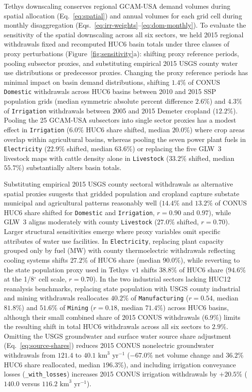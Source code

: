 \documentclass[fleqn,10pt]{wlscirep}
\begin{document}
Tethys downscaling conserves regional GCAM-USA demand volumes during spatial allocation (Eq.~\ref{eq:spatial}) and annual volumes for each grid cell during monthly disaggregation (Eqs.~\ref{eq:irr-weights}--\ref{eq:dom-monthly}). To evaluate the sensitivity of the spatial downscaling across all six sectors, we held 2015 regional withdrawals fixed and recomputed HUC6 basin totals under three classes of proxy perturbations (Figure~\ref{fig:sensitivity}a): shifting proxy reference periods, pooling subsector proxies, and substituting empirical 2015 USGS county water use distributions\cite{Dieter2018USGS} or predecessor proxies. Changing the proxy reference periods has minimal impact on basin demand distributions, shifting $1.4\%$ of CONUS \texttt{Domestic} withdrawals across HUC6 basins between 2010 and 2015 SSP population grids (median symmetric absolute percent difference $2.6\%$) and $4.3\%$ of \texttt{Irrigation} withdrawals between 2005 and 2015 Demeter cropland ($12.2\%$). Pooling the 25 GCAM-USA subsectors into single sector proxies has a modest effect in \texttt{Irrigation} ($6.0\%$ HUC6 share shifted, median $20.0\%$) where crop areas overlap within agricultural basins, whereas pooling the seven power plant fuels in \texttt{Electricity} ($22.9\%$ shifted, median $63.6\%$) or replacing the five GLW~3 livestock maps with cattle density alone in \texttt{Livestock} ($33.2\%$ shifted, median $55.7\%$) substantially alters basin totals.

Substituting empirical 2015 USGS county sectoral withdrawals\cite{Dieter2018USGS} as alternative spatial proxies suugests that gridded population and cropland capture substate municipal and agricultural patterns reasonably well ($14.4\%$ and $13.2\%$ of CONUS HUC6 share shifted for \texttt{Domestic} and \texttt{Irrigation}, $r=0.90$ and $0.97$), while GLW~3 aligns moderately with county \texttt{Livestock} ($27.0\%$ shifted, $r=0.70$). Larger structural sensitivities emerge where proxy variables omit specific attributes of water use facilities. In \texttt{Electricity}, replacing plant capacity grouped only by fuel (MW) with county thermoelectric withdrawals reflecting cooling systems shifts $27.2\%$ of HUC6 share (median $90.0\%$), while reverting to the state population proxy used in Tethys~v1\cite{Khan2023} shifts $38.8\%$ of HUC6 share ($94.6\%$ at the 1/8$^{\circ}$ cell scale, $r=0.70$). In the two industrial sectors lacking HUC12 reanalysis benchmarks, replacing state population with USGS county industrial and mining withdrawals reallocates $40.2\%$ of \texttt{Manufacturing} ($r=0.54$, median $81.8\%$) and $51.6\%$ of \texttt{Mining} ($r=0.18$, median $71.4\%$) across HUC6 basins, although their small combined share of 2015 CONUS withdrawals ($6.9\%$) limits the resulting shift in total HUC6 withdrawals across all six sectors to $2.9\%$. Omitting the USGS groundwater and surface water source share adjustment (Eq.~\ref{eq:source-shares}) reduces 2015 CONUS nonelectric groundwater withdrawals from $121.4$ to $40.1\text{ km}^3\text{ yr}^{-1}$ ($-67.0\%$ net volume change and $36.2\%$ HUC6 share reallocated, median $196.3\%$), and including irrigation conveyance losses (\texttt{\_with\_losses}) increases 2015 CONUS irrigation withdrawals by $+20.5\%$ ($140.0$ versus $116.2\text{ km}^3\text{ yr}^{-1}$).
\end{document}
